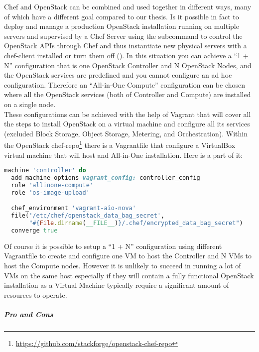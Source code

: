 Chef and OpenStack can be combined and used together in different ways, many of which have a different goal compared to our thesis. Is it possible in fact to deploy and manage a production OpenStack installation running on multiple servers and supervised by a Chef Server using the subcommand  to control the OpenStack APIs through Chef and thus instantiate new physical servers with a chef-client installed or turn them off ().
In this situation you can achieve a ``1 + N'' configuration that is one OpenStack Controller and N OpenStack Nodes, and the OpenStack services are predefined and you cannot configure an ad hoc configuration.
Therefore an ``All-in-One Compute'' configuration can be chosen where all the OpenStack services (both of Controller and Compute) are installed on a single node.\\
These configurations can be achieved with the help of Vagrant that will cover all the steps to install OpenStack on a virtual machine and configure all its services (excluded Block Storage, Object Storage, Metering, and Orchestration). Within the OpenStack chef-repo\footnote{\url{https://github.com/stackforge/openstack-chef-repo}} there is a Vagrantfile that configure a VirtualBox virtual machine that will host and All-in-One installation. Here is a part of it:

\begin{lstlisting}[language=Ruby]
machine 'controller' do
  add_machine_options vagrant_config: controller_config
  role 'allinone-compute'
  role 'os-image-upload'

  chef_environment 'vagrant-aio-nova'
  file('/etc/chef/openstack_data_bag_secret',
       "#{File.dirname(__FILE__)}/.chef/encrypted_data_bag_secret")
  converge true
\end{lstlisting}

Of course it is possible to setup a ``1 + N'' configuration using different Vagrantfile to create and configure one VM to host the Controller and N VMs to host the Compute nodes. However it is unlikely to succeed in running a lot of VMs on the same host especially if they will contain a fully functional OpenStack installation as a Virtual Machine typically require a significant amount of resources to operate.


\subparagraph{Pro and Cons}
\label{subp:sota_chef_pro_cons}

